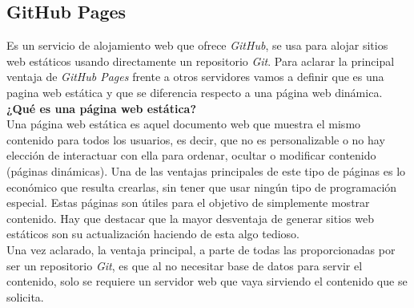 \documentclass[a4paper, 12pt]{book}
\begin{document}
\subsection*{GitHub Pages}
\label{subsec:githubpages}
Es un servicio de alojamiento web que ofrece \emph{GitHub}, se usa para alojar sitios web estáticos usando directamente un repositorio \emph{Git}. Para aclarar la principal ventaja de \emph{GitHub Pages} frente a otros servidores vamos a definir que es una pagina web estática y que se diferencia respecto a una página web dinámica. \\
\textbf{¿Qué es una página web estática?}\\
Una página web estática es aquel documento web que muestra el mismo contenido para todos los usuarios, es decir, que no es personalizable o no hay elección de interactuar con ella para ordenar, ocultar o modificar contenido (páginas dinámicas). Una de las ventajas principales de este tipo de páginas es lo económico que resulta crearlas, sin tener que usar ningún tipo de programación especial. Estas páginas son útiles para el objetivo de simplemente mostrar contenido. Hay que destacar que la mayor desventaja de generar sitios web estáticos son su actualización haciendo de esta algo tedioso. \\ 
Una vez aclarado, la ventaja principal, a parte de todas las proporcionadas por ser un repositorio \emph{Git}, es que al no necesitar base de datos para servir el contenido, solo se requiere un servidor web que vaya sirviendo el contenido que se solicita.
\end{document}
